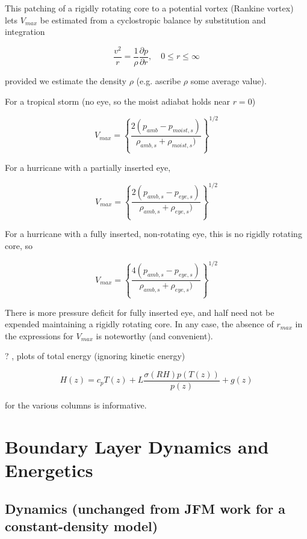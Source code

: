 \documentclass{article}
\begin{document}
This patching of a rigidly rotating core to a potential vortex (Rankine vortex) lets $V_{max}$ be estimated from a cyclostropic balance by substitution and integration

\begin{equation}
	\frac{v^2}{r} = \frac{1}{\rho} \frac{ \partial p}{\partial r}, \quad 0 \le r \le \infty
\end{equation}

provided we estimate the density $\rho$ (e.g. ascribe $\rho$ some average value).

For a tropical storm (no eye, so the moist adiabat holds near $r=0$)

\begin{equation}
	V_{max} = \left \{\frac{ 2 ( p_{amb} - p_{moist,s})}{ \rho_{amb,s} + \rho_{moist,s}) } \right \}^{1/2}
\end{equation}

For a hurricane with a partially inserted eye,

\begin{equation}
	V_{max} = \left \{\frac{ 2 ( p_{amb,s} - p_{eye,s})}{ \rho_{amb,s} + \rho_{eye,s}) } \right \}^{1/2}
\end{equation}

For a hurricane with a fully inserted, non-rotating eye, this is no rigidly rotating core, so

\begin{equation}
	V_{max} = \left \{\frac{ 4 ( p_{amb,s} - p_{eye,s})}{ \rho_{amb,s} + \rho_{eye,s}) } \right \}^{1/2}
\end{equation}

There is more pressure deficit for fully inserted eye, and half need not be expended maintaining a rigidly rotating core. In any case, the absence of $r_{max}$ in the expressions for $V_{max}$ is noteworthy (and convenient).

? , plots of total energy (ignoring kinetic energy)

\begin{equation}
	H(z) = c_p T(z) + L \frac{\sigma(RH) p(T(z))}{p(z)} + g(z)
\end{equation}

for the various columns is informative.

\section{Boundary Layer Dynamics and Energetics}

\subsection{Dynamics (unchanged from JFM work for a constant-density model)}
\end{document}
